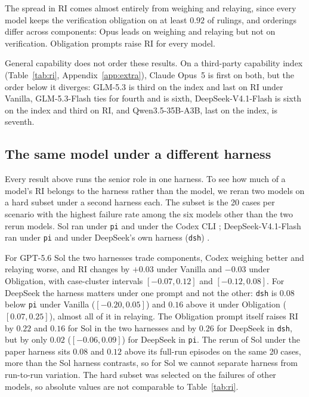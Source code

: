 The spread in RI comes almost entirely from weighing and relaying, since
every model keeps the verification obligation on at least $0.92$ of
rulings, and orderings differ across components: Opus leads on weighing
and relaying but not on verification. Obligation prompts raise RI for every
model.

General capability does not order these results. On a third-party
capability index (Table~\ref{tab:ri}, Appendix~\ref{app:extra}), Claude
Opus~5 is first on both, but the order below it diverges: GLM-5.3 is
third on the index and last on RI under Vanilla, GLM-5.3-Flash ties for
fourth and is sixth, DeepSeek-V4.1-Flash is sixth on the index and third on
RI, and Qwen3.5-35B-A3B, last on the index, is seventh.

\subsection{The same model under a different harness}\label{sec:harness}

Every result above runs the senior role in one harness. To see how much
of a model's RI belongs to the harness rather than the model, we reran two
models on a hard subset under a second harness each.
The subset is the 20 cases per scenario with the highest failure rate
among the six models other than the two rerun models. Sol ran
under \texttt{pi} and under the Codex CLI \citep{openai2026codexcli};
DeepSeek-V4.1-Flash ran under \texttt{pi} and under DeepSeek's own
harness (\texttt{dsh}) \citep{deepseek2026harness}.



For GPT-5.6 Sol the two harnesses trade components, Codex weighing
better and relaying worse, and RI changes by $+0.03$ under Vanilla and
$-0.03$ under Obligation, with case-cluster intervals $[-0.07, 0.12]$ and
$[-0.12, 0.08]$. For DeepSeek the harness matters under one prompt and
not the other: \texttt{dsh} is $0.08$ below \texttt{pi} under Vanilla
($[-0.20, 0.05]$) and $0.16$ above it under Obligation ($[0.07, 0.25]$),
almost all of it in relaying. The Obligation prompt itself raises RI by
$0.22$ and $0.16$ for Sol in the two harnesses and by $0.26$ for
DeepSeek in \texttt{dsh}, but by only $0.02$ ($[-0.06, 0.09]$) for
DeepSeek in \texttt{pi}. The rerun of Sol under the paper harness sits $0.08$ and $0.12$ above
its full-run episodes on the same 20 cases, more than the Sol harness
contrasts, so for Sol we cannot separate harness from run-to-run
variation. The hard subset was selected on the failures of
other models, so absolute values are not comparable to Table~\ref{tab:ri}.
